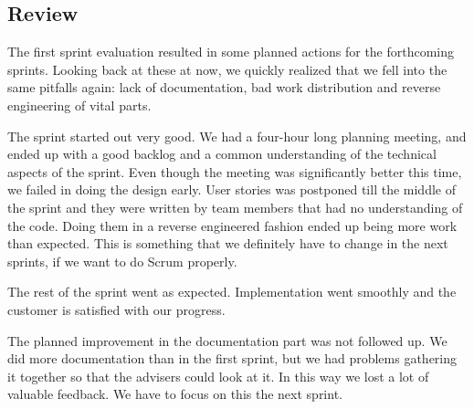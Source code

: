 \subsection{Review}
The first sprint evaluation resulted in some planned actions for the forthcoming sprints. Looking back at these at now, we quickly realized that we fell into the same pitfalls again: lack of documentation, bad work distribution and reverse engineering of vital parts.

The sprint started out very good. We had a four-hour long planning meeting, and ended up with a good backlog and a common understanding of the technical aspects of the sprint. Even though the meeting was significantly better this time, we failed in doing the design early. User stories was postponed till the middle of the sprint and they were written by team members that had no understanding of the code. Doing them in a reverse engineered fashion ended up being more work than expected. This is something that we definitely have to change in the next sprints, if we want to do Scrum properly.

The rest of the sprint went as expected. Implementation went smoothly and the customer is satisfied with our progress.

The planned improvement in the documentation part was not followed up. We did more documentation than in the first sprint, but we had problems gathering it together so that the advisers could look at it. In this way we lost a lot of valuable feedback. We have to focus on this the next sprint.

